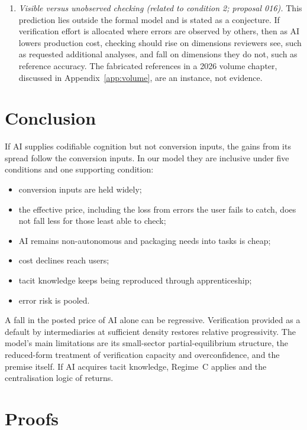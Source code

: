 \documentclass[12pt]{article}
\theoremstyle{remark}
\begin{document}
\begin{enumerate}[label=P\arabic*.,leftmargin=2.5em]
\item \emph{Visible versus unobserved checking (related to condition 2; proposal 016).} This prediction lies outside the formal model and is stated as a conjecture. If verification effort is allocated where errors are observed by others, then as AI lowers production cost, checking should rise on dimensions reviewers see, such as requested additional analyses, and fall on dimensions they do not, such as reference accuracy. The fabricated references in a 2026 volume chapter, discussed in Appendix~\ref{app:volume}, are an instance, not evidence.
\end{enumerate}

\section{Conclusion}\label{sec:conclusion}

If AI supplies codifiable cognition but not conversion inputs, the gains from its spread follow the conversion inputs. In our model they are inclusive under five conditions and one supporting condition:
\begin{itemize}[itemsep=0pt]
\item conversion inputs are held widely;
\item the effective price, including the loss from errors the user fails to catch, does not fall less for those least able to check;
\item AI remains non-autonomous and packaging needs into tasks is cheap;
\item cost declines reach users;
\item tacit knowledge keeps being reproduced through apprenticeship;
\item error risk is pooled.
\end{itemize}
A fall in the posted price of AI alone can be regressive. Verification provided as a default by intermediaries at sufficient density restores relative progressivity. The model's main limitations are its small-sector partial-equilibrium structure, the reduced-form treatment of verification capacity and overconfidence, and the premise itself. If AI acquires tacit knowledge, Regime~C applies and the centralisation logic of \citet{brynjolfsson2026hayek} returns.

\appendix
\sloppy
\section{Proofs}\label{app:proofs}
\end{document}
